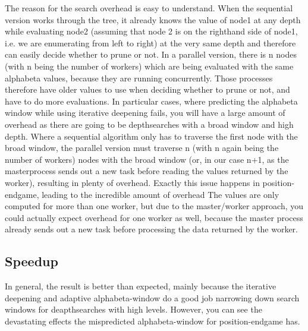 The reason for the search overhead is easy to understand. When the sequential version works through the tree, it already knows the value of node1 at any depth while evaluating node2 (assuming that node 2 is on the righthand side of node1, i.e. we are enumerating from left to right) at the very same depth and therefore can easily decide whether to prune or not. In a parallel version, there is n nodes (with n being the number of workers) which are being evaluated with the same alphabeta values, because they are running concurrently. Those processes therefore have older values to use when deciding whether to prune or not, and have to do more evaluations. In particular cases, where predicting the alphabeta window while using iterative deepening fails, you will have a large amount of overhead as there are going to be depthsearches with a broad window and high depth. Where a sequential algorithm only has to traverse the first node with the broad window, the parallel version must traverse n (with n again being the number of workers) nodes with the broad window (or, in our case n+1, as the masterprocess sends out a new task before reading the values returned by the worker), resulting in plenty of overhead. Exactly this issue happens in position-endgame, leading to the incredible amount of overhead
The values are only computed for more than one worker, but due to the master/worker approach, you could actually expect overhead for one worker as well, because the master process already sends out a new task before processing the data returned by the worker.

\subsection*{Speedup}

In general, the result is better than expected, mainly because the iterative deepening and adaptive alphabeta-window do a good job narrowing down search windows for deapthsearches with high levels. However, you can see the devastating effects the mispredicted alphabeta-window for position-endgame has.

